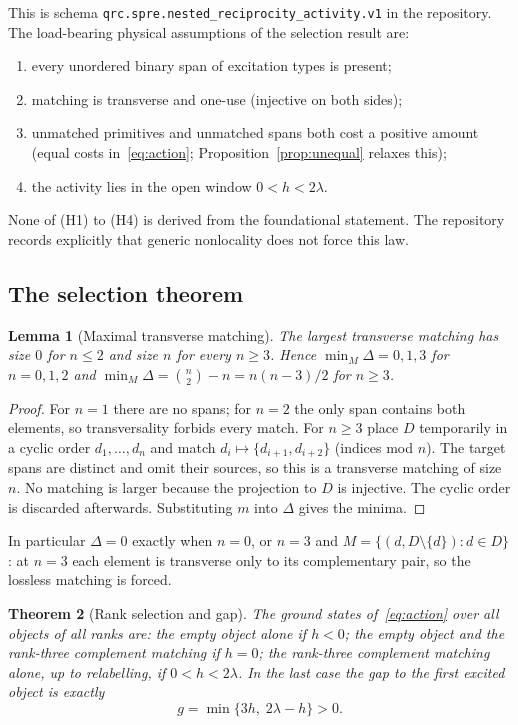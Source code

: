 \documentclass[11pt]{article}
\newtheorem{theorem}{Theorem}[section]
\newtheorem{lemma}[theorem]{Lemma}
\theoremstyle{definition}
\theoremstyle{remark}
\begin{document}
This is schema \texttt{qrc.spre.nested\_reciprocity\_activity.v1} in the repository. The
load-bearing physical assumptions of the selection result are:
\begin{enumerate}
\item[(H1)] every unordered binary span of excitation types is present;
\item[(H2)] matching is transverse and one-use (injective on both sides);
\item[(H3)] unmatched primitives and unmatched spans both cost a positive amount (equal
  costs in~\eqref{eq:action}; Proposition~\ref{prop:unequal} relaxes this);
\item[(H4)] the activity lies in the open window $0<h<2\lambda$.
\end{enumerate}
None of (H1) to (H4) is derived from the foundational statement. The repository records
explicitly that generic nonlocality does not force this law.

\subsection{The selection theorem}
\label{sec:selection}

\begin{lemma}[Maximal transverse matching]
\label{lem:maxmatch}
The largest transverse matching has size $0$ for $n\le2$ and size $n$ for every $n\ge3$.
Hence $\min_M\Delta=0,1,3$ for $n=0,1,2$ and $\min_M\Delta=\binom n2-n=n(n-3)/2$ for
$n\ge3$.
\end{lemma}

\begin{proof}
For $n=1$ there are no spans; for $n=2$ the only span contains both elements, so
transversality forbids every match. For $n\ge3$ place $D$ temporarily in a cyclic order
$d_1,\dots,d_n$ and match $d_i\mapsto\{d_{i+1},d_{i+2}\}$ (indices mod $n$). The target
spans are distinct and omit their sources, so this is a transverse matching of size $n$.
No matching is larger because the projection to $D$ is injective. The cyclic order is
discarded afterwards. Substituting $m$ into $\Delta$ gives the minima.
\end{proof}

In particular $\Delta=0$ exactly when $n=0$, or $n=3$ and $M=\{(d,D\setminus\{d\}):d\in D\}$:
at $n=3$ each element is transverse only to its complementary pair, so the lossless
matching is forced.

\begin{theorem}[Rank selection and gap]
\label{thm:selection}
The ground states of~\eqref{eq:action} over all objects of all ranks are: the empty
object alone if $h<0$; the empty object and the rank-three complement matching if $h=0$;
the rank-three complement matching alone, up to relabelling, if $0<h<2\lambda$. In the
last case the gap to the first excited object is exactly
\begin{equation}
g=\min\{3h,\;2\lambda-h\}>0 .
\label{eq:gap}
\end{equation}
\end{theorem}
\end{document}

